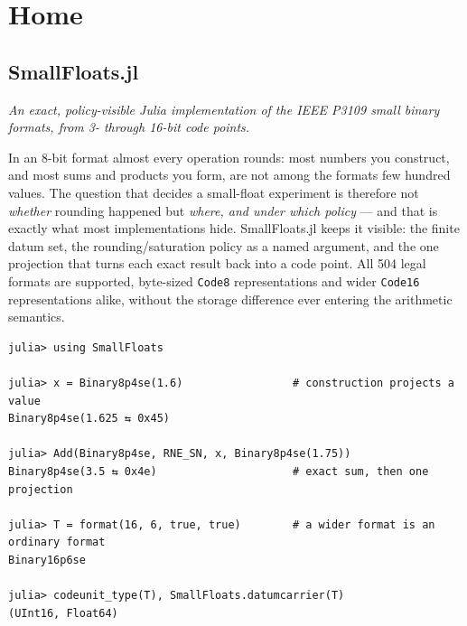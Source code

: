 \newcommand{\DocMainTitle}{SmallFloats.jl}
\newcommand{\DocVersion}{0.4.0}
\newcommand{\DocAuthors}{Jeffrey Sarnoff}
\newcommand{\JuliaVersion}{1.12.7}




\part{Home}


\chapter{SmallFloats.jl}



\label{2801651161961906345}{}


\emph{An exact, policy-visible Julia implementation of the IEEE P3109 small binary formats, from 3- through 16-bit code points.}



In an 8-bit format almost every operation rounds: most numbers you construct, and most sums and products you form, are not among the format{\textquotesingle}s few hundred values. The question that decides a small-float experiment is therefore not \emph{whether} rounding happened but \emph{where, and under which policy} — and that is exactly what most implementations hide. SmallFloats.jl keeps it visible: the finite datum set, the rounding/saturation policy as a named argument, and the one projection that turns each exact result back into a code point. All 504 legal formats are supported, byte-sized \texttt{Code8} representations and wider \texttt{Code16} representations alike, without the storage difference ever entering the arithmetic semantics.




\begin{verbatim}
julia> using SmallFloats

julia> x = Binary8p4se(1.6)                 # construction projects a value
Binary8p4se(1.625 ⇆ 0x45)

julia> Add(Binary8p4se, RNE_SN, x, Binary8p4se(1.75))
Binary8p4se(3.5 ⇆ 0x4e)                     # exact sum, then one projection

julia> T = format(16, 6, true, true)        # a wider format is an ordinary format
Binary16p6se

julia> codeunit_type(T), SmallFloats.datumcarrier(T)
(UInt16, Float64)
\end{verbatim}



